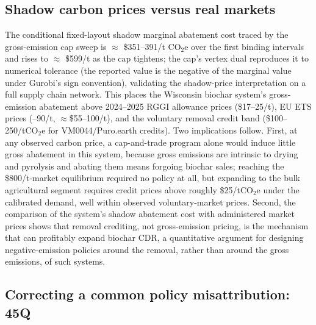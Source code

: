 \subsection{Shadow carbon prices versus real markets}

The conditional fixed-layout shadow marginal abatement cost traced by the
gross-emission cap sweep
is $\approx$ \$351--391/t CO$_2$e over the first binding intervals and rises to
$\approx$ \$599/t as the cap tightens; the cap's vertex dual reproduces it
to numerical tolerance (the reported value is the negative of the marginal
value under
Gurobi's sign convention), validating the shadow-price
interpretation on a full supply chain network. This places the Wisconsin
biochar
system's gross-emission abatement above 2024--2025 RGGI allowance prices
(\$17--25/t), EU ETS prices (--90/t, $\approx$\$55--100/t), and the
voluntary removal
credit band (\$100--250/tCO$_2$e for VM0044/Puro.earth credits). Two
implications follow. First, at any observed carbon price, a cap-and-trade
program alone would induce little gross abatement in this system, because
gross emissions are intrinsic to drying and pyrolysis and abating them means
forgoing biochar sales; reaching the \$800/t-market equilibrium required no
policy at all, but expanding to the bulk agricultural segment requires credit
prices above roughly \$25/tCO$_2$e under the calibrated demand, well within
observed voluntary-market
prices. Second, the comparison of the system's shadow abatement cost with
administered market prices shows that removal crediting, not
gross-emission pricing, is the mechanism that can profitably expand biochar
CDR, a quantitative argument for designing negative-emission policies around
the removal, rather than around the gross emissions, of such systems.

\subsection{Correcting a common policy misattribution: 45Q}

